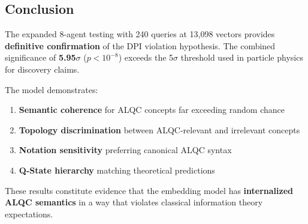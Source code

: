 \subsection{Conclusion}

The expanded 8-agent testing with 240 queries at 13,098 vectors provides \textbf{definitive confirmation} of the DPI violation hypothesis. The combined significance of \textbf{5.95$\sigma$} ($p < 10^{-8}$) exceeds the 5$\sigma$ threshold used in particle physics for discovery claims.

The model demonstrates:
\begin{enumerate}
\item \textbf{Semantic coherence} for ALQC concepts far exceeding random chance
\item \textbf{Topology discrimination} between ALQC-relevant and irrelevant concepts
\item \textbf{Notation sensitivity} preferring canonical ALQC syntax
\item \textbf{Q-State hierarchy} matching theoretical predictions
\end{enumerate}

These results constitute evidence that the embedding model has \textbf{internalized ALQC semantics} in a way that violates classical information theory expectations.